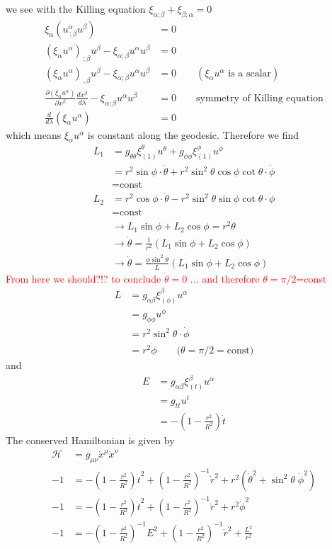\documentclass[10pt,a4paper]{book}
\theoremstyle{definition}
\begin{document}
we see with the Killing equation $\xi_{\alpha;\beta}+\xi_{\beta;\alpha}=0$
\begin{align}
\xi_\alpha (u^\alpha_{\,;\beta}u^\beta)&=0\\
(\xi_\alpha u^\alpha)_{\,;\beta}u^\beta-\xi_{\alpha;\beta}u^\alpha u^{\beta}&=0\\
(\xi_\alpha u^\alpha)_{\,,\beta}u^\beta-\xi_{\alpha;\beta}u^\alpha u^{\beta}&=0\qquad (\xi_\alpha u^\alpha \text{ is a scalar})\\
\frac{\partial(\xi_\alpha u^\alpha)}{\partial x^\beta}\frac{dx^\beta}{d\lambda}-\xi_{\alpha;\beta}u^\alpha u^{\beta}&=0\qquad\text{symmetry of Killing equation}\\
\frac{d}{d\lambda}(\xi_\alpha u^\alpha)&=0
\end{align}
which means $\xi_\alpha u^\alpha$ is constant along the geodesic. Therefore we find
\begin{align}
L_1&=g_{\theta\theta}\xi^\theta_{(1)}u^\theta+g_{\phi\phi}\xi^\phi_{(1)}u^\phi\\
&=r^2\sin\phi\cdot\dot{\theta}+r^2\sin^2\theta\cos\phi\cot\theta\cdot\dot{\phi}\\
&=\text{const}\\
L_2&=r^2\cos\phi\cdot\dot{\theta}-r^2\sin^2\theta\sin\phi\cot\theta\cdot\dot{\phi}\\
&=\text{const}\\
&\rightarrow L_1\sin\phi+L_2\cos\phi=r^2\dot\theta\\
&\rightarrow\dot\theta=\frac{1}{r^2}(L_1\sin\phi+L_2\cos\phi)\\
&\rightarrow\dot\theta=\frac{\dot\phi\sin^2\theta}{L}(L_1\sin\phi+L_2\cos\phi)
\end{align}
\textcolor{red}{From here we should?!? to conclude $\dot{\theta}=0$ ... and therefore $\theta=\pi/2$=const}
\begin{align}
L&=g_{\alpha\beta}\xi^\beta_{(\phi)}u^\alpha\\
&=g_{\phi\phi}u^\phi\\
&=r^2\sin^2\theta \cdot\dot{\phi}\\
&=r^2\dot{\phi}\qquad{(\theta=\pi/2=\text{const}})
\end{align}
and
\begin{align}
E&=g_{\alpha\beta}\xi^\beta_{(t)}u^\alpha\\
&=g_{tt}u^t\\
&=-\left(1-\frac{r^2}{R^2}\right)\dot{t}
\end{align}
The conserved Hamiltonian is given by
\begin{align}
\mathcal{H}
&=g_{\mu\nu}\dot{x}^\mu\dot{x}^\nu\\
-1&=-\left(1-\frac{r^2}{R^2}\right)\dot{t}^2+\left(1-\frac{r^2}{R^2}\right)^{-1}\dot{r}^2+r^2(\dot{\theta}^2+\sin^2\theta\;\dot{\phi}^2)\\
-1&=-\left(1-\frac{r^2}{R^2}\right)\dot{t}^2+\left(1-\frac{r^2}{R^2}\right)^{-1}\dot{r}^2+r^2\dot{\phi}^2\\
-1&=-\left(1-\frac{r^2}{R^2}\right)^{-1}E^2+\left(1-\frac{r^2}{R^2}\right)^{-1}\dot{r}^2+\frac{L^2}{r^2}
\end{align}
\end{document}
